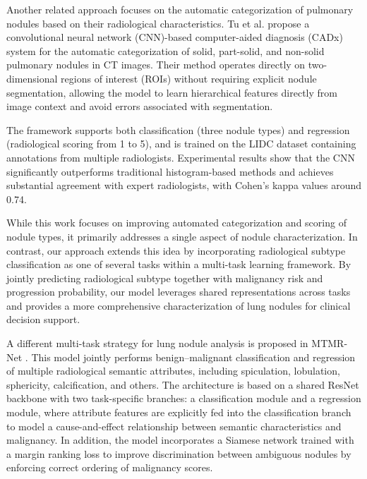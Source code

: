 \vspace{0.5cm}

Another related approach focuses on the automatic categorization of pulmonary nodules based on their radiological characteristics. Tu et al.\cite{tu2017} propose a convolutional neural network (CNN)-based computer-aided diagnosis (CADx) system for the automatic categorization of solid, part-solid, and non-solid pulmonary nodules in CT images. Their method operates directly on two-dimensional regions of interest (ROIs) without requiring explicit nodule segmentation, allowing the model to learn hierarchical features directly from image context and avoid errors associated with segmentation.

The framework supports both classification (three nodule types) and regression (radiological scoring from 1 to 5), and is trained on the LIDC dataset containing annotations from multiple radiologists. Experimental results show that the CNN significantly outperforms traditional histogram-based methods and achieves substantial agreement with expert radiologists, with Cohen’s kappa values around 0.74.

While this work focuses on improving automated categorization and scoring of nodule types, it primarily addresses a single aspect of nodule characterization. In contrast, our approach extends this idea by incorporating radiological subtype classification as one of several tasks within a multi-task learning framework. By jointly predicting radiological subtype together with malignancy risk and progression probability, our model leverages shared representations across tasks and provides a more comprehensive characterization of lung nodules for clinical decision support.

\vspace{0.5cm}

A different multi-task strategy for lung nodule analysis is proposed in MTMR-Net \cite{Liu2020}. This model jointly performs benign–malignant classification and regression of multiple radiological semantic attributes, including spiculation, lobulation, sphericity, calcification, and others. The architecture is based on a shared ResNet backbone with two task-specific branches: a classification module and a regression module, where attribute features are explicitly fed into the classification branch to model a cause-and-effect relationship between semantic characteristics and malignancy. In addition, the model incorporates a Siamese network trained with a margin ranking loss to improve discrimination between ambiguous nodules by enforcing correct ordering of malignancy scores.

